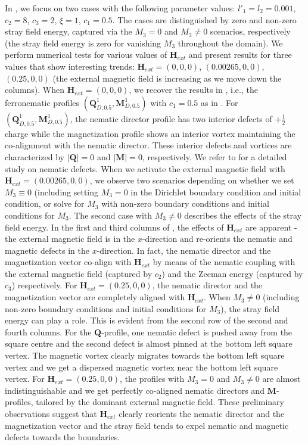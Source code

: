 \documentclass{article}
\def\Qvec{\mathbf{Q}}
\def \Mvec{\mathbf{M}}
\def\Hvec{\mathbf{H}}
\begin{document}
In , we focus on two cases with the following parameter values: $l'_1=l_2=0.001$, $c_2=8$, $c_3=2$, $\xi=1$, $c_1=0.5$. The cases are distinguished by zero and non-zero stray field energy, captured via the $M_3=0$ and $M_3\ne 0$ scenarios, respectively (the stray field energy is zero for vanishing $M_3$ throughout the domain). We perform numerical tests for various values of $\Hvec_{ext}$ and present results for three values that show interesting trends: $\Hvec_{ext}=\left(0,0,0\right)$, $ \left(0.00265, 0, 0\right)$, $ \left(0.25, 0, 0\right)$ (the external magnetic field is increasing as we move down the columns). When $\Hvec_{ext}=\left(0, 0, 0\right)$, we recover the results in \cite{Bisht2020}, i.e., the ferronematic profiles $\left(\Qvec^1_{D, 0.5}, \Mvec^1_{D, 0.5}\right)$ with $c_1=0.5$ as in \cite{Bisht2020}. For $\left(\Qvec^1_{D, 0.5}, \Mvec^1_{D, 0.5}\right)$, the nematic director profile has two interior defects of $+\frac{1}{2}$ charge while the magnetization profile shows an interior vortex maintaining the co-alignment with the nematic director. These interior defects and vortices are characterized by $|\Qvec|=0$ and $|\Mvec|=0$, respectively. We refer to \cite{ball_notes} for a detailed study on nematic defects. 
When we activate the external magnetic field with $\Hvec_{ext}=\left(0.00265, 0, 0\right)$, we observe two scenarios depending on whether we set $M_3 \equiv 0$ (including setting $M_3=0$ in the Dirichlet boundary condition and initial condition, or solve for $M_3$ with non-zero boundary conditions and initial conditions for $M_3$.  
The second case with $M_3 \neq 0$ describes the effects of the stray field energy. In the first and third columns of , the effects of $\Hvec_{ext}$ are apparent - the external magnetic field is in the $x$-direction and re-orients the nematic and magnetic defects in the $x$-direction. In fact, the nematic director and the magnetization vector co-align with $\Hvec_{ext}$ by means of the nematic coupling with the external magnetic field (captured by $c_2$) and the Zeeman energy (captured by $c_3$) respectively. For $\Hvec_{ext}=\left(0.25, 0, 0\right)$, the nematic director and the magnetization vector are completely aligned with $\Hvec_{ext}$. When $M_3 \neq 0$ (including non-zero boundary conditions  
and initial conditions for $M_3$), the stray field energy can play a role. This is evident from the second row of the second and fourth columns. For the $\Qvec$-profile, one nematic defect is pushed away from the square centre and the second defect is almost pinned at the bottom left square vertex. The magnetic vortex clearly migrates towards the bottom left square vertex and we get a dispersed magnetic vortex near the bottom left square vertex.  For $\Hvec_{ext}=\left(0.25, 0, 0\right)$, the profiles with $M_3=0$ and $M_3 \neq 0$ are almost indistinguishable and we get perfectly co-aligned nematic directors and $\Mvec$-profiles, tailored by the dominant external magnetic field. These preliminary observations suggest that $\Hvec_{ext}$ clearly reorients the nematic director and the magnetization vector and the stray field tends to expel nematic and magnetic defects towards the boundaries.
 
\end{document}
